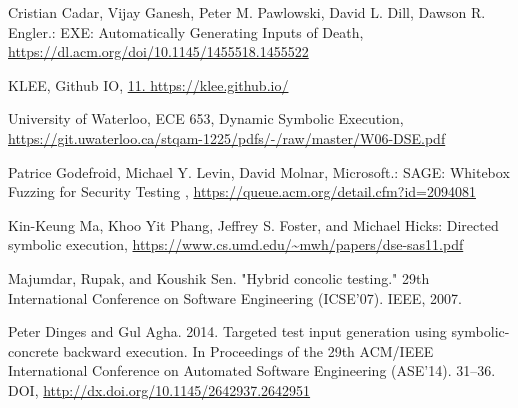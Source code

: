 \documentclass[11pt]{llncs}
\begin{document}
\begin{thebibliography}{9}
Cristian Cadar, Vijay Ganesh, Peter M. Pawlowski, David L. Dill, Dawson R. Engler.:  EXE: Automatically Generating Inputs of Death,  \url {https://dl.acm.org/doi/10.1145/1455518.1455522}

KLEE, Github IO,  \url {11.	https://klee.github.io/}

University of Waterloo, ECE 653, Dynamic Symbolic Execution,  \url {https://git.uwaterloo.ca/stqam-1225/pdfs/-/raw/master/W06-DSE.pdf}

Patrice Godefroid, Michael Y. Levin, David Molnar, Microsoft.:  SAGE: Whitebox Fuzzing for Security Testing ,  \url {https://queue.acm.org/detail.cfm?id=2094081}

Kin-Keung Ma, Khoo Yit Phang, Jeffrey S. Foster, and Michael Hicks:  Directed symbolic execution,  \url {https://www.cs.umd.edu/~mwh/papers/dse-sas11.pdf}

Majumdar, Rupak, and Koushik Sen. "Hybrid concolic testing." 29th International Conference on Software Engineering (ICSE'07). IEEE, 2007.

Peter Dinges and Gul Agha. 2014. Targeted test input generation using symbolic-concrete backward execution. In Proceedings of the 29th ACM/IEEE International Conference on Automated Software Engineering (ASE’14). 31–36. DOI,  \url{http://dx.doi.org/10.1145/2642937.2642951}

\end{thebibliography}
\end{document}
